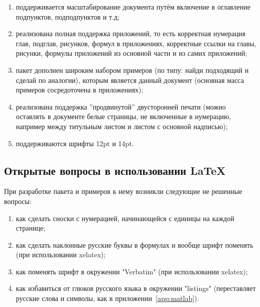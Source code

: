 \begin{enumerate}
  \item поддерживается масштабирование документа путём включение в оглавление подпунктов, подподпунктов и т.д;
  \item реализована полная поддержка приложений, то есть корректная нумерация глав, подглав, рисунков, формул в приложениях, корректные ссылки на главы, рисунки, формулы приложений из основной части и из самих приложений;
  \item пакет дополнен широким набором примеров (по типу: найди подходящий и сделай по аналогии), которым является данный документ (основная масса примеров сосредоточена в приложениях);
  \item реализована поддержка ''продвинутой'' двусторонней печати (можно оставлять в документе белые страницы, не включенные в нумерацию, например между титульным листом и листом с основной надписью);
  \item поддерживаются шрифты 12pt и 14pt.
\end{enumerate}


\subsection{Открытые вопросы в использовании \LaTeX}

При разработке пакета и примеров к нему возникли следующие не решенные вопросы:
\begin{enumerate}
  \item как сделать сноски с нумерацией, начинающейся с единицы на каждой странице;
  \item как сделать наклонные русские буквы в формулах и вообще шрифт поменять (при использовании xelatex);
  \item как поменять шрифт в окружении "Verbatim" (при использовании xelatex);
  \item как избавиться от глюков русского языка в окружении "listings" (переставляет русские слова и символы, как в приложении~\ref{app:matlab}).
\end{enumerate}




